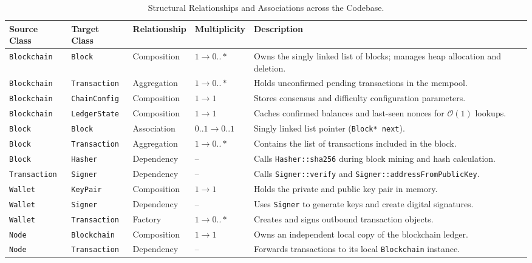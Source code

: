 \documentclass[11pt,a4paper]{report}
\begin{document}
\clearpage

\begin{table}[H]
\centering
\small
\renewcommand{\arraystretch}{1.25}
\begin{tabularx}{\textwidth}{llllX}
\toprule
\textbf{Source Class} & \textbf{Target Class} & \textbf{Relationship} & \textbf{Multiplicity} & \textbf{Description} \\
\midrule
\texttt{Blockchain} & \texttt{Block} & Composition & $1 \to 0..\ast$ & Owns the singly linked list of blocks; manages heap allocation and deletion. \\
\texttt{Blockchain} & \texttt{Transaction} & Aggregation & $1 \to 0..\ast$ & Holds unconfirmed pending transactions in the mempool. \\
\texttt{Blockchain} & \texttt{ChainConfig} & Composition & $1 \to 1$ & Stores consensus and difficulty configuration parameters. \\
\texttt{Blockchain} & \texttt{LedgerState} & Composition & $1 \to 1$ & Caches confirmed balances and last-seen nonces for $\mathcal{O}(1)$ lookups. \\
\texttt{Block} & \texttt{Block} & Association & $0..1 \to 0..1$ & Singly linked list pointer (\texttt{Block* next}). \\
\texttt{Block} & \texttt{Transaction} & Aggregation & $1 \to 0..\ast$ & Contains the list of transactions included in the block. \\
\texttt{Block} & \texttt{Hasher} & Dependency & -- & Calls \texttt{Hasher::sha256} during block mining and hash calculation. \\
\texttt{Transaction} & \texttt{Signer} & Dependency & -- & Calls \texttt{Signer::verify} and \texttt{Signer::addressFromPublicKey}. \\
\texttt{Wallet} & \texttt{KeyPair} & Composition & $1 \to 1$ & Holds the private and public key pair in memory. \\
\texttt{Wallet} & \texttt{Signer} & Dependency & -- & Uses \texttt{Signer} to generate keys and create digital signatures. \\
\texttt{Wallet} & \texttt{Transaction} & Factory & $1 \to 0..\ast$ & Creates and signs outbound transaction objects. \\
\texttt{Node} & \texttt{Blockchain} & Composition & $1 \to 1$ & Owns an independent local copy of the blockchain ledger. \\
\texttt{Node} & \texttt{Transaction} & Dependency & -- & Forwards transactions to its local \texttt{Blockchain} instance. \\
\bottomrule
\end{tabularx}
\caption{Structural Relationships and Associations across the Codebase.}
\label{tab:associations}
\end{table}
\end{document}
